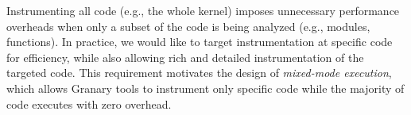 \documentclass[preprint]{sigplanconf}
\begin{document}


Instrumenting all code (e.g., the whole kernel) imposes unnecessary performance overheads when only a subset of the code is being analyzed (e.g., modules, functions). In practice, we would like to target instrumentation at specific code for efficiency, while also allowing rich and detailed instrumentation of the targeted code. This requirement motivates the design of \emph{mixed-mode execution}, which allows Granary tools to instrument only specific code while the majority of code executes with zero overhead. 

\end{document}
